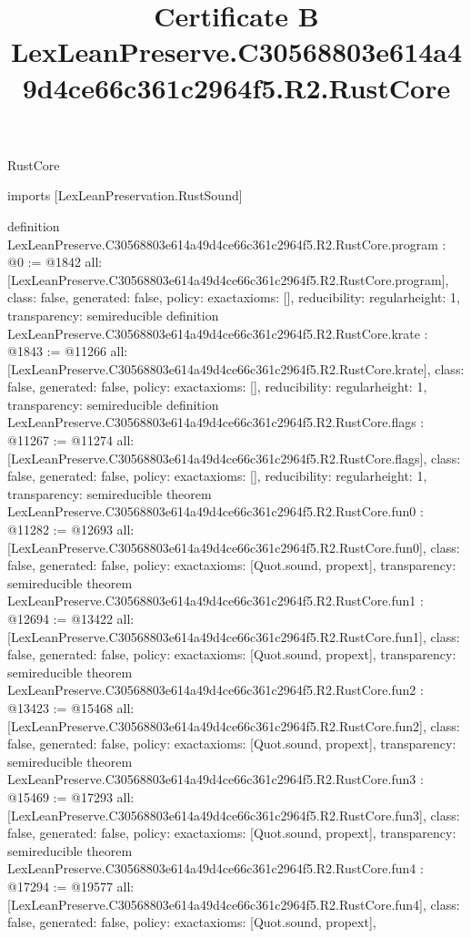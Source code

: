 \begin{lexlean}{RustCore}
\title{Certificate B LexLeanPreserve.C30568803e614a49d4ce66c361c2964f5.R2.RustCore}
\begin{coremodule}
imports [LexLeanPreservation.RustSound]

definition LexLeanPreserve.C30568803e614a49d4ce66c361c2964f5.R2.RustCore.program : @0 := @1842 {
  all: [LexLeanPreserve.C30568803e614a49d4ce66c361c2964f5.R2.RustCore.program],
  class: false,
  generated: false,
  policy: exact{axioms: []},
  reducibility: regular{height: 1},
  transparency: semireducible
}
definition LexLeanPreserve.C30568803e614a49d4ce66c361c2964f5.R2.RustCore.krate : @1843 := @11266 {
  all: [LexLeanPreserve.C30568803e614a49d4ce66c361c2964f5.R2.RustCore.krate],
  class: false,
  generated: false,
  policy: exact{axioms: []},
  reducibility: regular{height: 1},
  transparency: semireducible
}
definition LexLeanPreserve.C30568803e614a49d4ce66c361c2964f5.R2.RustCore.flags : @11267 := @11274 {
  all: [LexLeanPreserve.C30568803e614a49d4ce66c361c2964f5.R2.RustCore.flags],
  class: false,
  generated: false,
  policy: exact{axioms: []},
  reducibility: regular{height: 1},
  transparency: semireducible
}
theorem LexLeanPreserve.C30568803e614a49d4ce66c361c2964f5.R2.RustCore.fun0 : @11282 := @12693 {
  all: [LexLeanPreserve.C30568803e614a49d4ce66c361c2964f5.R2.RustCore.fun0],
  class: false,
  generated: false,
  policy: exact{axioms: [Quot.sound, propext]},
  transparency: semireducible
}
theorem LexLeanPreserve.C30568803e614a49d4ce66c361c2964f5.R2.RustCore.fun1 : @12694 := @13422 {
  all: [LexLeanPreserve.C30568803e614a49d4ce66c361c2964f5.R2.RustCore.fun1],
  class: false,
  generated: false,
  policy: exact{axioms: [Quot.sound, propext]},
  transparency: semireducible
}
theorem LexLeanPreserve.C30568803e614a49d4ce66c361c2964f5.R2.RustCore.fun2 : @13423 := @15468 {
  all: [LexLeanPreserve.C30568803e614a49d4ce66c361c2964f5.R2.RustCore.fun2],
  class: false,
  generated: false,
  policy: exact{axioms: [Quot.sound, propext]},
  transparency: semireducible
}
theorem LexLeanPreserve.C30568803e614a49d4ce66c361c2964f5.R2.RustCore.fun3 : @15469 := @17293 {
  all: [LexLeanPreserve.C30568803e614a49d4ce66c361c2964f5.R2.RustCore.fun3],
  class: false,
  generated: false,
  policy: exact{axioms: [Quot.sound, propext]},
  transparency: semireducible
}
theorem LexLeanPreserve.C30568803e614a49d4ce66c361c2964f5.R2.RustCore.fun4 : @17294 := @19577 {
  all: [LexLeanPreserve.C30568803e614a49d4ce66c361c2964f5.R2.RustCore.fun4],
  class: false,
  generated: false,
  policy: exact{axioms: [Quot.sound, propext]},
}
\end{coremodule}
\end{lexlean}
